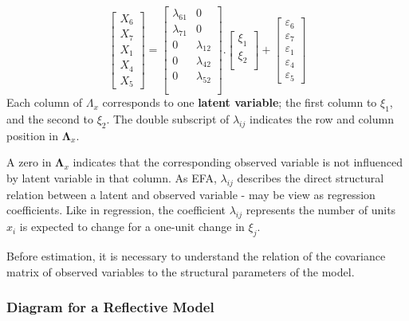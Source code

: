 \documentclass[
]{article}
\begin{document}
\[
\begin{bmatrix}
X_{6}\\
X_{7}\\
X_{1}\\
X_{4}\\
X_{5}
\end{bmatrix}
=
\begin{bmatrix}
\lambda_{61} & 0 \\
\lambda_{71} & 0 \\
0 & \lambda_{12} \\
0 & \lambda_{42} \\
0 & \lambda_{52} \\\\
\end{bmatrix}
.
\begin{bmatrix}
\xi_{1}\\
\xi_{2}\\
\end{bmatrix}
+
\begin{bmatrix}
\varepsilon_{6}\\
\varepsilon_{7}\\
\varepsilon_{1}\\
\varepsilon_{4}\\
\varepsilon_{5}
\end{bmatrix}
\] Each column of \(\Lambda_{x}\) corresponds to one \textbf{latent
variable}; the first column to \(\xi_{1}\), and the second to
\(\xi_{2}\). The double subscript of \(\lambda_{ij}\) indicates the row
and column position in \(\mathbf{\Lambda}_{x}\).

A zero in \(\mathbf{\Lambda}_{x}\) indicates that the corresponding
observed variable is not influenced by latent variable in that column.
As EFA, \(\lambda_{ij}\) describes the direct structural relation
between a latent and observed variable - may be view as regression
coefficients. Like in regression, the coefficient \(\lambda_{ij}\)
represents the number of units \(x_{i}\) is expected to change for a
one-unit change in \(\xi_{j}\).

Before estimation, it is necessary to understand the relation of the
covariance matrix of observed variables to the structural parameters of
the model.

\hypertarget{diagram-for-a-reflective-model}{%
\subsubsection{Diagram for a Reflective
Model}\label{diagram-for-a-reflective-model}}
\end{document}
